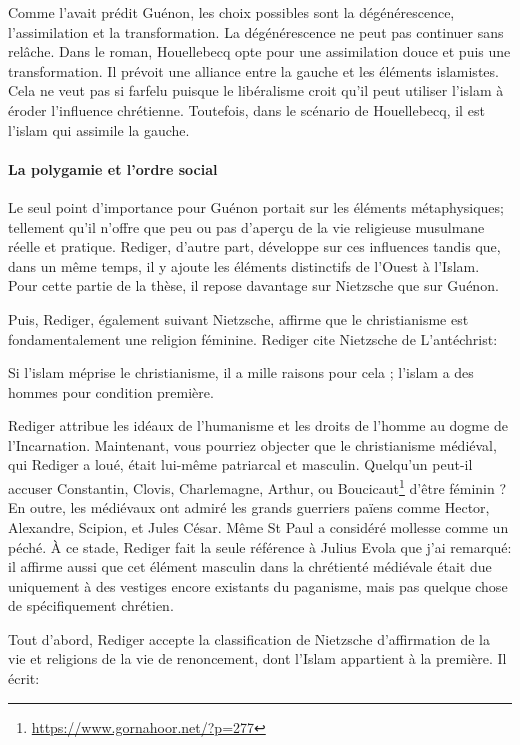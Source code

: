 Comme l'avait prédit Guénon, les choix possibles sont la dégénérescence, l'assimilation et la transformation. La dégénérescence ne peut pas continuer sans relâche. Dans le roman, Houellebecq opte pour une assimilation douce et puis une transformation. Il prévoit une alliance entre la gauche et les éléments islamistes. Cela ne veut pas si farfelu puisque le libéralisme croit qu'il peut utiliser l'islam à éroder l'influence chrétienne. Toutefois, dans le scénario de Houellebecq, il est l'islam qui assimile la gauche.

\paragraph{La polygamie et l'ordre social}


Le seul point d'importance pour Guénon portait sur les éléments métaphysiques; tellement qu'il n'offre que peu ou pas d'aperçu de la vie religieuse musulmane réelle et pratique. Rediger, d'autre part, développe sur ces influences tandis que, dans un même temps, il y ajoute les éléments distinctifs de l'Ouest à l'Islam. Pour cette partie de la thèse, il repose davantage sur Nietzsche que sur Guénon.

Puis, Rediger, également suivant Nietzsche, affirme que le christianisme est fondamentalement une religion féminine. Rediger cite Nietzsche de L'antéchrist:

\begin{quotex}
Si l'islam méprise le christianisme, il a mille raisons pour cela ; l'islam a des hommes pour condition première.
\end{quotex}


Rediger attribue les idéaux de l'humanisme et les droits de l'homme au dogme de l'Incarnation. Maintenant, vous pourriez objecter que le christianisme médiéval, qui Rediger a loué, était lui-même patriarcal et masculin. Quelqu'un peut-il accuser Constantin, Clovis, Charlemagne, Arthur, ou Boucicaut\footnote{\url{https://www.gornahoor.net/?p=277}} d'être féminin ? En outre, les médiévaux ont admiré les grands guerriers païens comme Hector, Alexandre, Scipion, et Jules César. Même St Paul a considéré mollesse comme un péché. À ce stade, Rediger fait la seule référence à Julius Evola que j'ai remarqué: il affirme aussi que cet élément masculin dans la chrétienté médiévale était due uniquement à des vestiges encore existants du paganisme, mais pas quelque chose de spécifiquement chrétien.

Tout d'abord, Rediger accepte la classification de Nietzsche d'affirmation de la vie et religions de la vie de renoncement, dont l'Islam appartient à la première. Il écrit:

